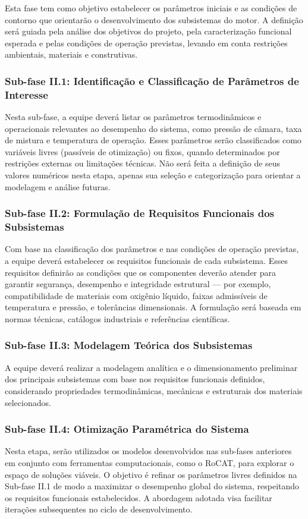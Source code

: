 Esta fase tem como objetivo estabelecer os parâmetros iniciais e as condições de contorno que orientarão o desenvolvimento dos subsistemas do motor. A definição será guiada pela análise dos objetivos do projeto, pela caracterização funcional esperada e pelas condições de operação previstas, levando em conta restrições ambientais, materiais e construtivas.

\subsubsection{Sub-fase II.1: Identificação e Classificação de Parâmetros de Interesse}
Nesta sub-fase, a equipe deverá listar os parâmetros termodinâmicos e operacionais relevantes ao desempenho do sistema, como pressão de câmara, taxa de mistura e temperatura de operação. Esses parâmetros serão classificados como variáveis livres (passíveis de otimização) ou fixos, quando determinados por restrições externas ou limitações técnicas. Não será feita a definição de seus valores numéricos nesta etapa, apenas sua seleção e categorização para orientar a modelagem e análise futuras.

\subsubsection{Sub-fase II.2: Formulação de Requisitos Funcionais dos Subsistemas}
Com base na classificação dos parâmetros e nas condições de operação previstas, a equipe deverá estabelecer os requisitos funcionais de cada subsistema. Esses requisitos definirão as condições que os componentes deverão atender para garantir segurança, desempenho e integridade estrutural — por exemplo, compatibilidade de materiais com oxigênio líquido, faixas admissíveis de temperatura e pressão, e tolerâncias dimensionais. A formulação será baseada em normas técnicas, catálogos industriais e referências científicas.

\subsubsection{Sub-fase II.3: Modelagem Teórica dos Subsistemas}
A equipe deverá realizar a modelagem analítica e o dimensionamento preliminar dos principais subsistemas com base nos requisitos funcionais definidos, considerando propriedades termodinâmicas, mecânicas e estruturais dos materiais selecionados.

\subsubsection{Sub-fase II.4: Otimização Paramétrica do Sistema}
Nesta etapa, serão utilizados os modelos desenvolvidos nas sub-fases anteriores em conjunto com ferramentas computacionais, como o \gls{RoCAT}, para explorar o espaço de soluções viáveis. O objetivo é refinar os parâmetros livres definidos na Sub-fase II.1 de modo a maximizar o desempenho global do sistema, respeitando os requisitos funcionais estabelecidos. A abordagem adotada visa facilitar iterações subsequentes no ciclo de desenvolvimento.

